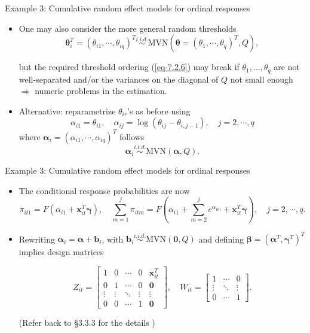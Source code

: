 \documentclass{beamer}
\newcommand{\boldbeta}{{\boldsymbol \beta}}
\newcommand{\boldalpha}{{\boldsymbol \alpha}}
\newcommand{\boldtheta}{{\boldsymbol \theta}}
\newcommand{\boldgamma}{{\boldsymbol \gamma}}
\begin{document}
\begin{frame}{Example 3: Cumulative  random effect models for ordinal responses}

\begin{itemize}
\item
One may also consider the more general random thresholds
$$\boldtheta_i^T=(\theta_{i1},\cdots, \theta_{iq})^T\stackrel{i.i.d.}{\sim}\text{MVN}(
\boldtheta=(\theta_1,\cdots,\theta_q)^T, Q), $$

but the required threshold ordering (\ref{eq-7.2.6}) may break if 
 $\theta_1 ,\dots, \theta_q$ are not well-separated and/or the variances on the diagonal of $Q$ not small enough\\
  $\Rightarrow $ numeric problems in the estimation.
\item
Alternative: reparametrize $\theta_{ir}$'s as before using
$$\alpha_{i1}=\theta_{i1}, \quad \alpha_{ij}=\log(\theta_{ij}-\theta_{i,j-1}), \quad j=2,\cdots, q$$
where $\boldalpha_i=(\alpha_{i1},\cdots, \alpha_{iq})^T$ follows
\[
\boldalpha_i\stackrel{i.i.d.}{\sim}\text{MVN}(\boldalpha,  Q).
\] 
\end{itemize}
\end{frame}

\begin{frame}{Example 3: Cumulative  random effect models for ordinal responses}
\begin{itemize}
\item
The conditional response probabilities are now
$$\pi_{it1}\!=\!F(\alpha_{i1}+\mathbf{x}_{it}^T\boldgamma), \quad \sum_{m=1}^j\!\pi_{itm}
\!=\!F\!\left(\!\alpha_{i1}\!+\!\sum_{m=2}^j\!e^{\alpha_{im}}\!+\!\mathbf{x}_{it}^T\boldgamma
\!\right), \quad\!\! j\!=\!2,\cdots,q.$$
\item
Rewriting  $\boldalpha_i=\boldalpha+\mathbf{b}_i$,
with $\mathbf{b}_i\stackrel{i.i.d.}{\sim}\text{MVN}(\mathbf{0}, Q)$ and defining $\boldbeta=
(\boldalpha^T, \boldgamma^T)^T$ implies design matrices

\[
Z_{it}=\left[\begin{array}{ccccc}1 &0 & \cdots & 0 & \mathbf{x}_{it}^T \\ 0 & 1 & \cdots & 0& \mathbf{0} \\
\vdots & \vdots & \ddots & \vdots & \vdots \\ 0 & 0 & \cdots & 1 & \mathbf{0}\end{array}\right], \quad
W_{it}=\left[\begin{array}{ccc} 1 & \cdots & 0 \\ \vdots & \ddots & \vdots \\ 0 & \cdots & 1 \end{array} \right].
\]

(Refer back to \S 3.3.3  for the details )
\end{itemize}
\end{frame}
\end{document}
